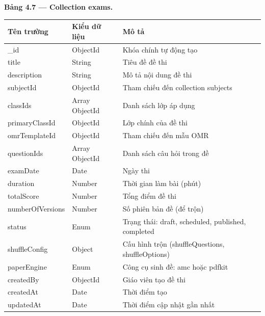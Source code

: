 ﻿\documentclass[../DoAn.tex]{subfiles}
\begin{document}
\noindent\textbf{Bảng 4.7 — Collection exams.}
\begin{center}
\begin{tabular}{|p{3.5cm}|p{2.5cm}|p{7cm}|}
\hline
\textbf{Tên trường} & \textbf{Kiểu dữ liệu} & \textbf{Mô tả} \\ \hline
\_id & ObjectId & Khóa chính tự động tạo \\ \hline
title & String & Tiêu đề đề thi \\ \hline
description & String & Mô tả nội dung đề thi \\ \hline
subjectId & ObjectId & Tham chiếu đến collection subjects \\ \hline
classIds & Array ObjectId & Danh sách lớp áp dụng \\ \hline
primaryClassId & ObjectId & Lớp chính của đề thi \\ \hline
omrTemplateId & ObjectId & Tham chiếu đến mẫu OMR \\ \hline
questionIds & Array ObjectId & Danh sách câu hỏi trong đề \\ \hline
examDate & Date & Ngày thi \\ \hline
duration & Number & Thời gian làm bài (phút) \\ \hline
totalScore & Number & Tổng điểm đề thi \\ \hline
numberOfVersions & Number & Số phiên bản đề (để trộn) \\ \hline
status & Enum & Trạng thái: draft, scheduled, published, completed \\ \hline
shuffleConfig & Object & Cấu hình trộn (shuffleQuestions, shuffleOptions) \\ \hline
paperEngine & Enum & Công cụ sinh đề: amc hoặc pdfkit \\ \hline
createdBy & ObjectId & Giáo viên tạo đề thi \\ \hline
createdAt & Date & Thời điểm tạo \\ \hline
updatedAt & Date & Thời điểm cập nhật gần nhất \\ \hline
\end{tabular}
\end{center}

\vspace{0.3cm}
\end{document}
